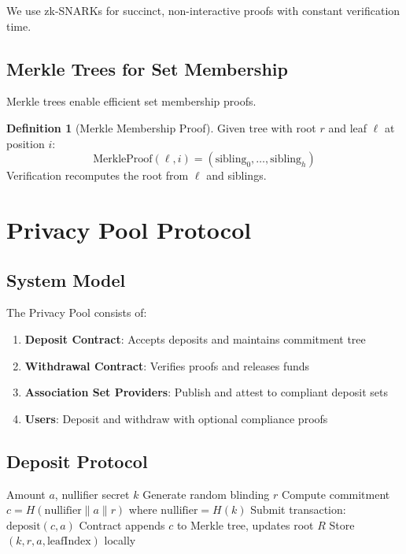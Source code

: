 \documentclass[11pt,a4paper]{article}
\theoremstyle{definition}
\newtheorem{definition}{Definition}
\begin{document}
We use zk-SNARKs for succinct, non-interactive proofs with constant verification time.

\subsection{Merkle Trees for Set Membership}

Merkle trees enable efficient set membership proofs.

\begin{definition}[Merkle Membership Proof]
Given tree with root $r$ and leaf $\ell$ at position $i$:
\[
\text{MerkleProof}(\ell, i) = (\text{sibling}_0, \ldots, \text{sibling}_h)
\]
Verification recomputes the root from $\ell$ and siblings.
\end{definition}

\section{Privacy Pool Protocol}

\subsection{System Model}

The Privacy Pool consists of:
\begin{enumerate}
    \item \textbf{Deposit Contract}: Accepts deposits and maintains commitment tree
    \item \textbf{Withdrawal Contract}: Verifies proofs and releases funds
    \item \textbf{Association Set Providers}: Publish and attest to compliant deposit sets
    \item \textbf{Users}: Deposit and withdraw with optional compliance proofs
\end{enumerate}

\subsection{Deposit Protocol}

\begin{algorithm}
\caption{Privacy Pool Deposit}
\begin{algorithmic}[1]
\Require Amount $a$, nullifier secret $k$
\State Generate random blinding $r$
\State Compute commitment $c = H(\text{nullifier} \| a \| r)$ where $\text{nullifier} = H(k)$
\State Submit transaction: $\text{deposit}(c, a)$
\State Contract appends $c$ to Merkle tree, updates root $R$
\State Store $(k, r, a, \text{leafIndex})$ locally
\end{algorithmic}
\end{algorithm}
\end{document}

